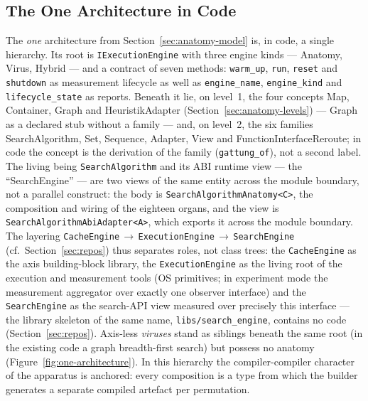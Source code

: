 \begin{nurlang}
\subsection{The One Architecture in Code}\label{sec:impl-architecture}
The \emph{one} architecture from Section~\ref{sec:anatomy-model} is, in code, a single hierarchy.
Its root is \texttt{IExecutionEngine} with three engine kinds --- Anatomy, Virus, Hybrid --- and a
contract of seven methods: \texttt{warm\_up}, \texttt{run}, \texttt{reset} and \texttt{shutdown} as
measurement lifecycle as well as \texttt{engine\_name}, \texttt{engine\_kind} and
\texttt{lifecycle\_state} as reports. Beneath it lie, on level~1, the four concepts Map, Container,
Graph and HeuristikAdapter (Section~\ref{sec:anatomy-levels}) --- Graph as a declared stub without a
family --- and, on level~2, the six families SearchAlgorithm, Set, Sequence, Adapter, View and
FunctionInterfaceReroute; in code the concept is the derivation of the family (\texttt{gattung\_of}), not
a second label. The living being \texttt{SearchAlgorithm} and its ABI runtime view --- the
\enquote{SearchEngine} --- are two views of the same entity across the module boundary, not a parallel
construct: the body is \texttt{SearchAlgorithmAnatomy<C>}, the composition and wiring of the eighteen
organs, and the view is \texttt{SearchAlgorithmAbiAdapter<A>}, which exports it across the module
boundary. The layering \texttt{CacheEngine}\,$\to$\,\texttt{ExecutionEngine}\,$\to$\,\texttt{SearchEngine}
(cf.\ Section~\ref{sec:repos}) thus separates roles, not class trees: the \texttt{CacheEngine} as the
axis building-block library, the \texttt{ExecutionEngine} as the living root of the execution and
measurement tools (OS primitives; in experiment mode the measurement aggregator over exactly one
observer interface) and the \texttt{SearchEngine} as the search-API view measured over precisely this
interface --- the library skeleton of the same name, \texttt{libs/search\_engine}, contains no code
(Section~\ref{sec:repos}). Axis-less \emph{viruses} stand as siblings beneath the same root (in the
existing code a graph breadth-first search) but possess no anatomy (Figure~\ref{fig:one-architecture}).
In this hierarchy the compiler-compiler character of the apparatus is anchored: every composition is a
type from which the builder generates a separate compiled artefact per permutation.
\end{nurlang}
